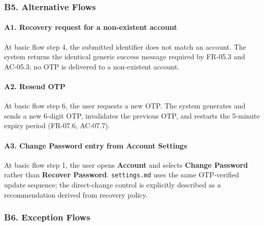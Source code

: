 \documentclass[12pt]{article}
\begin{document}
\hypertarget{sec:b5-alternative-flows}{}
\subsubsection*{B5. Alternative Flows}
\par\medskip

\hypertarget{sec:a1-recovery-request-for-a-non-existent-account}{}
\paragraph*{A1. Recovery request for a non-existent account}
\par\medskip

At basic flow step 4, the submitted identifier does not match an account. The system returns the identical generic success message required by FR-05.3 and AC-05.3; no OTP is delivered to a non-existent account.
\par\medskip

\hypertarget{sec:a2-resend-otp}{}
\paragraph*{A2. Resend OTP}
\par\medskip

At basic flow step 6, the user requests a new OTP. The system generates and sends a new 6-digit OTP, invalidates the previous OTP, and restarts the 5-minute expiry period (FR-07.6, AC-07.7).
\par\medskip

\hypertarget{sec:a3-change-password-entry-from-account-settings}{}
\paragraph*{A3. Change Password entry from Account Settings}
\par\medskip

At basic flow step 1, the user opens \textbf{Account} and selects \textbf{Change Password} rather than \textbf{Recover Password}. \texttt{settings.md} uses the same OTP-verified update sequence; the direct-change control is explicitly described as a recommendation derived from recovery policy.
\par\medskip

\hypertarget{sec:b6-exception-flows}{}
\subsubsection*{B6. Exception Flows}
\par\medskip
\end{document}
